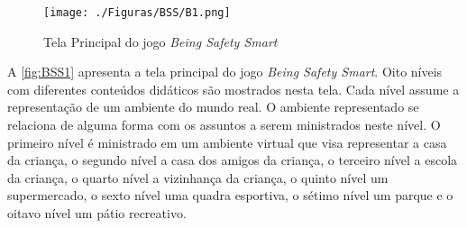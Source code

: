 
\begin{figure}[htb]
	\caption{\label{fig:BSS1}Tela Principal do jogo \textit{Being Safety Smart}}
  \begin{center}%
    \texttt{[image: ./Figuras/BSS/B1.png]}
	\end{center}%

\end{figure}

A \autoref{fig:BSS1} apresenta a tela principal do jogo \textit{Being Safety Smart}. Oito níveis com diferentes conteúdos didáticos são mostrados nesta tela. Cada nível assume a representação de um ambiente do mundo real. O ambiente representado se relaciona de alguma forma com os assuntos a serem ministrados neste nível. O primeiro nível é ministrado em um ambiente virtual que visa representar a casa da criança, o segundo nível a casa dos amigos da criança, o terceiro nível a escola da criança, o quarto nível a vizinhança da criança, o quinto nível um supermercado, o sexto nível uma quadra esportiva, o sétimo nível um parque e o oitavo nível um pátio recreativo.

